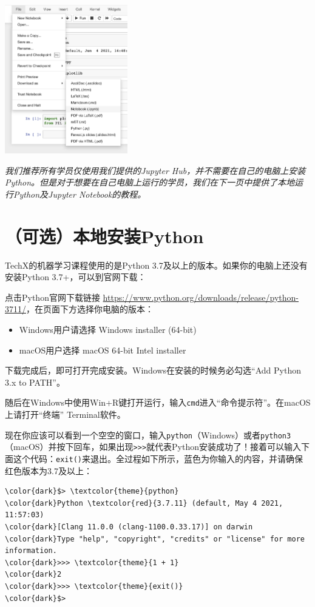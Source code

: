 \documentclass{article}
\begin{document}
  \vspace*{0.3cm}\centerline{\noindent\includegraphics[width=0.4\textwidth]{notebook-download.png}}

\vspace{2em}
\emph{我们推荐所有学员仅使用我们提供的Jupyter Hub，并不需要在自己的电脑上安装Python。但是对于想要在自己电脑上运行的学员，我们在下一页中提供了本地运行Python及Jupyter Notebook的教程。}

\newpage
\section{（可选）本地安装Python}
TechX的机器学习课程使用的是Python 3.7及以上的版本。如果你的电脑上还没有安装Python 3.7+，可以到官网下载：

点击Python官网下载链接 \url{https://www.python.org/downloads/release/python-3711/}，在页面下方选择你电脑的版本：
\begin{itemize}
\item
Windows用户请选择 Windows installer (64-bit)
\item
macOS用户选择 macOS 64-bit Intel installer
\end{itemize}
下载完成后，即可打开完成安装。Windows在安装的时候务必勾选“Add Python 3.x to PATH”。

随后在Windows中使用Win+R键打开运行，输入\texttt{cmd}进入“命令提示符”。在macOS上请打开“终端” Terminal软件。

现在你应该可以看到一个空空的窗口，输入\texttt{python}（Windows）或者\texttt{python3}（macOS）并按下回车，如果出现\texttt{>>>}就代表Python安装成功了！接着可以输入下面这个代码：\texttt{exit()}来退出。全过程如下所示，蓝色为你输入的内容，并请确保红色版本为3.7及以上：

\begin{Verbatim}[commandchars=\\\{\},xleftmargin=1.5cm]
\color{dark}$> \textcolor{theme}{python}
\color{dark}Python \textcolor{red}{3.7.11} (default, May 4 2021, 11:57:03)
\color{dark}[Clang 11.0.0 (clang-1100.0.33.17)] on darwin
\color{dark}Type "help", "copyright", "credits" or "license" for more information.
\color{dark}>>> \textcolor{theme}{1 + 1}
\color{dark}2
\color{dark}>>> \textcolor{theme}{exit()}
\color{dark}$>
\end{Verbatim}
\end{document}
